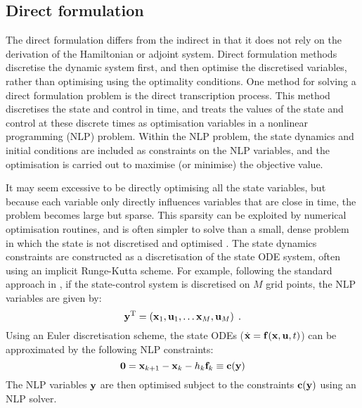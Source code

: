 \subsection{Direct formulation}

The direct formulation differs from the indirect in that it does not rely on the derivation of the Hamiltonian or adjoint system. Direct formulation methods discretise the dynamic system first, and then optimise the discretised variables, rather than optimising using the optimality conditions. One method for solving a direct formulation problem is the direct transcription process. This method discretises the state and control in time, and treats the values of the state and control at these discrete times as optimisation variables in a nonlinear programming (NLP) problem. Within the NLP problem, the state dynamics and initial conditions are included as constraints on the NLP variables, and the optimisation is carried out to maximise (or minimise) the objective value.

It may seem excessive to be directly optimising all the state variables, but because each variable only directly influences variables that are close in time, the problem becomes large but sparse. This sparsity can be exploited by numerical optimisation routines, and is often simpler to solve than a small, dense problem in which the state is not discretised and optimised \citep{betts_practical_2010}. The state dynamics constraints are constructed as a discretisation of the state ODE system, often using an implicit Runge-Kutta scheme. For example, following the standard approach in \citet{betts_practical_2010}, if the state-control system is discretised on $M$ grid points, the NLP variables are given by:
\begin{equation}
    \mathbf{\bm{y}}^\mathrm{T} = \left(\mathbf{\bm{x}}_1, \mathbf{\bm{u}}_1, \ldots \mathbf{\bm{x}}_M, \mathbf{\bm{u}}_M\right)\;.
\end{equation}
Using an Euler discretisation scheme, the state ODEs ($\dot{\mathbf{\bm{x}}} = \mathbf{\bm{f}}(\mathbf{\bm{x}}, \mathbf{\bm{u}}, t)$) can be approximated by the following NLP constraints:
\begin{equation}
    \mathbf{\bm{0}} = \mathbf{\bm{x}}_{k+1} - \mathbf{\bm{x}}_k -h_k\mathbf{\bm{f}}_k \equiv \mathbf{\bm{c}}(\mathbf{\bm{y}})
\end{equation}
The NLP variables $\mathbf{\bm{y}}$ are then optimised subject to the constraints $\mathbf{\bm{c}}(\mathbf{\bm{y}})$ using an NLP solver.

